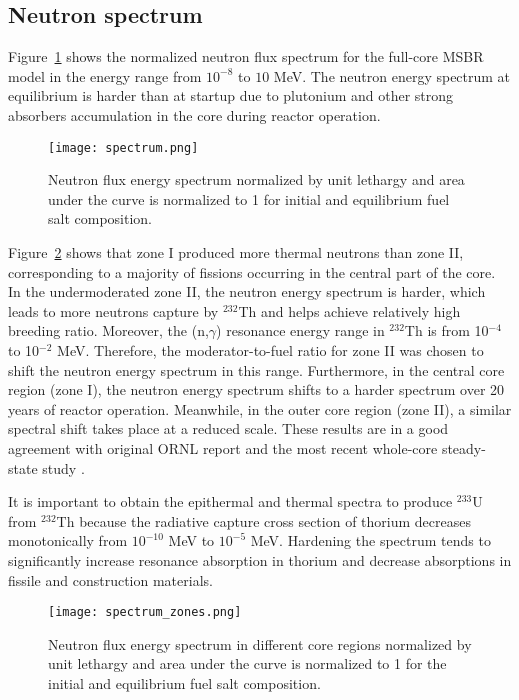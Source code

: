 \subsection{Neutron spectrum}
Figure~\ref{fig:spectrum} shows the normalized neutron flux spectrum for the 
full-core \gls{MSBR} model in the energy range from $10^{-8}$ to $10$ MeV. The 
neutron energy spectrum at equilibrium is harder than at startup due to 
plutonium and other strong absorbers accumulation in the core during reactor 
operation.  
\begin{figure}[ht!] %
  \centering
  \texttt{[image: spectrum.png]} \caption{Neutron flux energy 
  spectrum normalized by unit lethargy and area under the curve is normalized to 1 for initial and equilibrium fuel salt 
  composition.}
  \label{fig:spectrum}
\end{figure}

Figure~\ref{fig:spectrum_zones} shows that zone I produced more thermal neutrons 
than zone II, corresponding to a majority of fissions occurring in the central part 
of the core. In the undermoderated zone II, the neutron energy spectrum is harder, 
which leads to more neutrons capture by $^{232}$Th and helps achieve relatively 
high breeding ratio. Moreover, the (n,$\gamma$) resonance energy range in $^{232}$Th 
is from 10$^{-4}$ to 10$^{-2}$ MeV. Therefore, the moderator-to-fuel ratio for zone 
II was chosen to shift the neutron energy spectrum in this range. Furthermore, in the 
central core region (zone I), the neutron energy spectrum shifts to a harder spectrum 
over 20 years of reactor operation. Meanwhile, in the outer core region (zone II), a 
similar spectral shift takes place at a reduced scale. These results are in a good 
agreement with original ORNL report \cite{robertson_conceptual_1971} and the most recent 
whole-core steady-state study \cite{park_whole_2015}.

It is important to obtain the epithermal and thermal spectra to produce $^{233}$U from 
$^{232}$Th because the radiative capture cross section of thorium decreases monotonically 
from $10^{-10}$ MeV to $10^{-5}$ MeV. Hardening the spectrum tends to significantly 
increase resonance absorption in thorium and decrease absorptions in fissile and 
construction materials. 
\begin{figure}[ht!] %
  \centering
  \texttt{[image: spectrum\_zones.png]} 
  \caption{Neutron flux energy spectrum in different core regions normalized by 
unit lethargy and area under the curve is normalized to 1 for the initial and equilibrium fuel salt composition.}
  \label{fig:spectrum_zones}
\end{figure}

